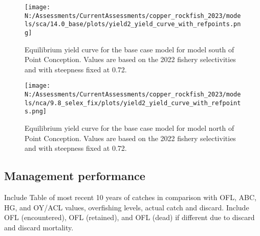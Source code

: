\documentclass[11pt,
  english,
  letterpaper,
]{article}
\begin{document}
\begin{figure}
\centering
\texttt{[image: N:/Assessments/CurrentAssessments/copper\_rockfish\_2023/models/sca/14.0\_base/plots/yield2\_yield\_curve\_with\_refpoints.png]}
\caption{Equilibrium yield curve for the base case model for model south of Point Conception. Values are based on the 2022 fishery selectivities and with steepness fixed at 0.72.\label{fig:south-es-yield}}
\end{figure}

\begin{figure}
\centering
\texttt{[image: N:/Assessments/CurrentAssessments/copper\_rockfish\_2023/models/nca/9.8\_selex\_fix/plots/yield2\_yield\_curve\_with\_refpoints.png]}
\caption{Equilibrium yield curve for the base case model for model north of Point Conception. Values are based on the 2022 fishery selectivities and with steepness fixed at 0.72.\label{fig:north-es-yield}}
\end{figure}

\hypertarget{management-performance}{%
\subsection*{Management performance}\label{management-performance}}

Include Table of most recent 10 years of catches in comparison with OFL, ABC, HG, and OY/ACL values, overfishing levels, actual catch and discard. Include OFL (encountered), OFL (retained), and OFL (dead) if different due to discard and discard mortality.

\begingroup\fontsize{10}{12}\selectfont
\begingroup\fontsize{10}{12}\selectfont
\end{document}
